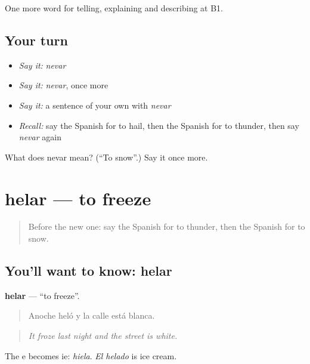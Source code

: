 \begin{grammarlens}[title={What you've built}]
One more word for telling, explaining and describing at B1.
\end{grammarlens}

\subsection*{Your turn}
\begin{itemize}
\raggedright
  \item \emph{Say it:} \emph{nevar}
  \item \emph{Say it:} \emph{nevar}, once more
  \item \emph{Say it:} a sentence of your own with \emph{nevar}
  \item \emph{Recall:} say the Spanish for to hail, then the Spanish for to thunder, then say \emph{nevar} again
\end{itemize}

\begin{tcolorbox}[breakable,colback=teal!4,colframe=teal!35!black,title={Before you move on}]
What does nevar mean? (\textquotedblleft{}To snow\textquotedblright{}.) Say it once more.
\end{tcolorbox}
\section[helar]{helar — to freeze}

\label{lesson:ES-C700-helar}



\begin{quote}
Before the new one: say the Spanish for to thunder, then the Spanish for to snow.
\end{quote}

\subsection*{You'll want to know: helar}
\textbf{helar} — \textquotedblleft{}to freeze\textquotedblright{}.

\begin{quote}
Anoche heló y la calle está blanca.
\end{quote}

\begin{quote}
\emph{It froze last night and the street is white.}
\end{quote}

The e becomes ie: \emph{hiela}. \emph{El helado} is ice cream.

